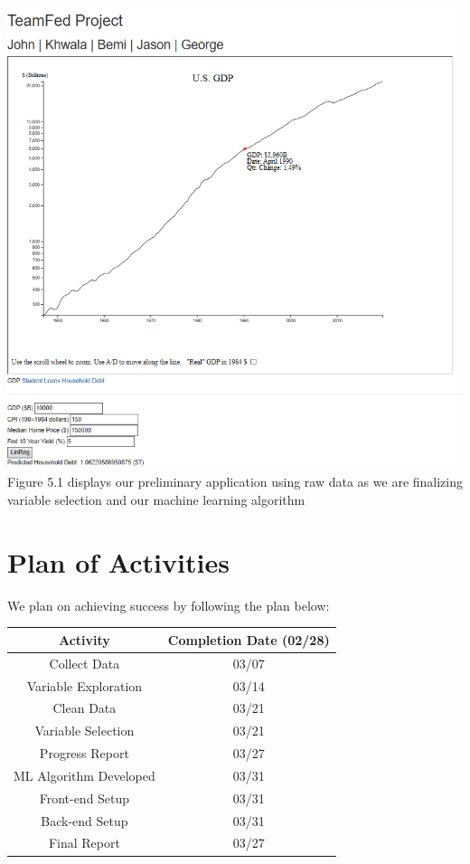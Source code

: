 \documentclass[sigconf,nonacm,11pt]{acmart}
\begin{document}
\includegraphics[scale = 0.59]{teamfed2.PNG}
Figure 5.1 displays our preliminary application using raw data as we are finalizing variable selection and our machine learning algorithm \vspace{-0.5em}


\section{Plan of Activities}

We plan on achieving success by following the plan below:\vspace{0.07em}
\begin{center}
    \begin{tabular}{||c|c||}
    \hline
    Activity & Completion Date (02/28)\\
    \hline\hline
    Collect Data & 03/07\\
    Variable Exploration & 03/14\\
    Clean Data & 03/21\\
    Variable Selection & 03/21\\
    Progress Report & 03/27\\
    ML Algorithm Developed & 03/31\\
    Front-end Setup & 03/31 \\
    Back-end Setup & 03/31 \\
    Final Report & 03/27\\
    \hline
    \end{tabular}
\end{center}
\end{document}
